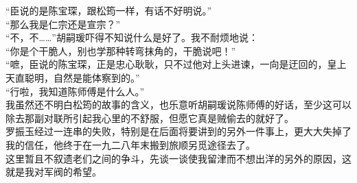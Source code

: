 “臣说的是陈宝琛，跟松筠一样，有话不好明说。”\\

“那么我是仁宗还是宣宗？”\\

“不，不……”胡嗣瑗吓得不知说什么是好了。我不耐烦地说：\\

“你是个干脆人，别也学那种转弯抹角的，干脆说吧！”\\

“嗻，臣说的陈宝琛，正是忠心耿耿，只不过他对上头进谏，一向是迂回的，皇上天直聪明，自然是能体察到的。”\\

“行啦，我知道陈师傅是什么人。”\\

我虽然还不明白松筠的故事的含义，也乐意听胡嗣瑗说陈师傅的好话，至少这可以除去那副对联所引起我心里的不舒服，但愿它真是贼偷去的就好了。\\

罗振玉经过一连串的失败，特别是在后面将要讲到的另外一件事上，更大大失掉了我的信任，他终于在一九二八年末搬到旅顺另觅途径去了。\\

这里暂且不叙遗老们之间的争斗，先谈一谈使我留津而不想出洋的另外的原因，这就是我对军阀的希望。\\